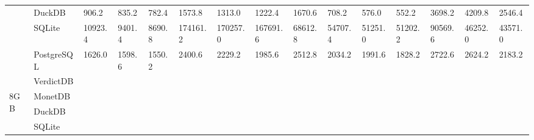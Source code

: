 \begin{table}[]
\begin{tabular}{ll|lllllllllllll}
                     & DuckDB     & 906.2                   & 835.2                   & 782.4                   & 1573.8                  & 1313.0                  & 1222.4                  & 1670.6                  & 708.2                   & 576.0                   & 552.2                   & 3698.2                  & 4209.8                  & 2546.4                  \\
                     & SQLite     & 10923.4                 & 9401.4                  & 8690.8                  & 174161.2                & 170257.0                & 167691.6                & 68612.8                 & 54707.4                 & 51251.0                 & 51202.2                 & 90569.6                 & 46252.0                 & 43571.0                 \\
                     & PostgreSQL & 1626.0                  & 1598.6                  & 1550.2                  & 2400.6                  & 2229.2                  & 1985.6                  & 2512.8                  & 2034.2                  & 1991.6                  & 1828.2                  & 2722.6                  & 2624.2                  & 2183.2                  \\
                     & VerdictDB  &                         &                         &                         &                         &                         &                         &                         &                         &                         &                         &                         &                         &                         \\ \hline
\multirow{5}{*}{8GB} & MonetDB    &                         &                         &                         &                         &                         &                         &                         &                         &                         &                         &                         &                         &                         \\
                     & DuckDB     &                         &                         &                         &                         &                         &                         &                         &                         &                         &                         &                         &                         &                         \\
                     & SQLite     &                         &                         &                         &                         &                         &                         &                         &                         &                         &                         &                         &                         &                         \\

\end{tabular}
\end{table}

